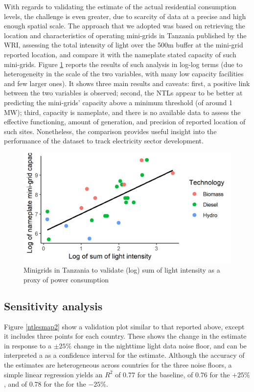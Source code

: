 \documentclass[preprint,12pt]{elsarticle}
\begin{document}
With regards to validating the estimate of the actual residential consumption levels, the challenge is even greater, due to scarcity of data at a precise and high enough spatial scale. The approach that we adopted was based on retrieving the location and characteristics of operating mini-grids in Tanzania published by the WRI, assessing the total intensity of light over the 500m buffer at the mini-grid reported location, and compare it with the nameplate stated capacity of such mini-grids. Figure \ref{mg} reports the results of such analysis in log-log terms (due to heterogeneity in the scale of the two variables, with many low capacity facilities and few larger ones). It shows three main results and caveats: first, a positive link between the two variables is observed; second, the NTLs appear to be better at predicting the mini-grids' capacity above a minimum threshold (of around 1 MW); third, capacity is nameplate, and there is no available data to assess the effective functioning, amount of generation, and precision of reported location of such sites. Nonetheless, the comparison provides useful insight into the performance of the dataset to track electricity sector development.

\begin{figure}[H]
    \centering
    \includegraphics{figures/mgtza.png}
    \caption{Minigrids in Tanzania to validate (log) sum of light intensity as a proxy of power consumption}
    \label{mg}
\end{figure}

\subsection{Sensitivity analysis} \label{sensitivity}
Figure \ref{ntlesmap2} show a validation plot similar to that reported above, except it includes three points for each country. These shows the change in the estimate in response to a $\pm25\%$ change in the nighttime light data noise floor, and can be interpreted a as a confidence interval for the estimate. Although the accuracy of the estimates are heterogeneous across countries for the three noise floors, a simple linear regression yields an $R^2$ of 0.77 for the baseline, of 0.76 for the $+25\%$, and of 0.78 for the for the $-25\%$. 
\end{document}
